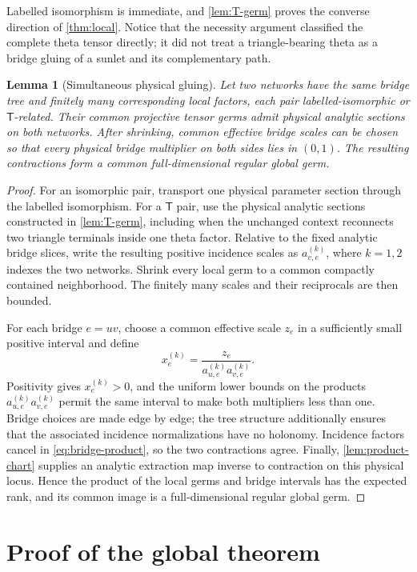 \documentclass[11pt]{article}
\newtheorem{lemma}[theorem]{Lemma}
\theoremstyle{remark}
\newcommand{\Tmove}{\mathsf T}
\begin{document}
Labelled isomorphism is immediate, and \cref{lem:T-germ} proves the converse
direction of \cref{thm:local}.  Notice that the necessity argument classified
the complete theta tensor directly; it did not treat a triangle-bearing theta
as a bridge gluing of a sunlet and its complementary path.

\begin{lemma}[Simultaneous physical gluing]\label{lem:physical-gluing}
Let two networks have the same bridge tree and finitely many corresponding
local factors, each pair labelled-isomorphic or $\Tmove$-related.  Their
common projective tensor germs admit physical analytic sections on both
networks.  After shrinking, common effective bridge scales can be chosen so
that every physical bridge multiplier on both sides lies in $(0,1)$.  The
resulting contractions form a common full-dimensional regular global germ.
\end{lemma}

\begin{proof}
For an isomorphic pair, transport one physical parameter section through the
labelled isomorphism.  For a $\Tmove$ pair, use the physical analytic sections
constructed in \cref{lem:T-germ}, including when the unchanged context
reconnects two triangle terminals inside one theta factor.  Relative to the
fixed analytic bridge slices, write the resulting positive incidence scales
as $a_{v,e}^{(k)}$, where $k=1,2$ indexes the two networks.  Shrink every
local germ to a common compactly contained neighborhood.  The finitely many
scales and their reciprocals are then bounded.

For each bridge $e=uv$, choose a common effective scale $z_e$ in a sufficiently
small positive interval and define
\[
x_e^{(k)}=\frac{z_e}{a_{u,e}^{(k)}a_{v,e}^{(k)}}.
\]
Positivity gives $x_e^{(k)}>0$, and the uniform lower bounds on the products
$a_{u,e}^{(k)}a_{v,e}^{(k)}$ permit the same
interval to make both multipliers less than one.  Bridge choices are
made edge by edge; the tree structure additionally ensures that the
associated incidence normalizations have no holonomy.  Incidence factors cancel in
\eqref{eq:bridge-product}, so the two contractions agree.  Finally,
\cref{lem:product-chart} supplies an analytic extraction map inverse to
contraction on this physical locus.  Hence the product of the local germs and
bridge intervals has the expected rank, and its common image is a
full-dimensional regular global germ.
\end{proof}

\section{Proof of the global theorem}\label{sec:global}
\end{document}
